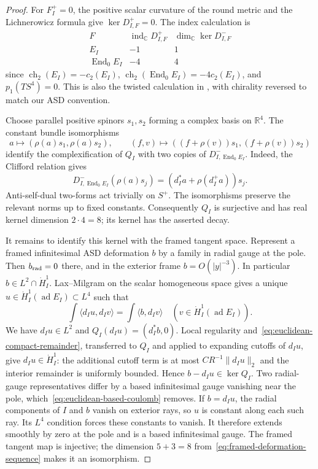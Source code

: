 \documentclass[11pt]{amsart}
\theoremstyle{definition}
\theoremstyle{remark}
\theoremstyle{plain}
\newcommand{\RR}{\mathbb{R}}
\newcommand{\CC}{\mathbb{C}}
\newcommand{\ad}{\operatorname{ad}}
\newcommand{\ind}{\operatorname{ind}}
\begin{document}
\begin{proof}
For $F_I^+=0$, the positive scalar curvature of the round metric
and the Lichnerowicz formula give $\ker D_{I,F}^+=0$.  The index
calculation is
\begin{equation}\label{eq:twisted-index-table}
 \begin{array}{c|cc}
 F&\ind_{\CC}D_{I,F}^+&\dim_{\CC}\ker D_{I,F}^-\\ \hline
 E_I&-1&1\\
 \operatorname{End}_0E_I&-4&4
 \end{array}
\end{equation}
since $\operatorname{ch}_2(E_I)=-c_2(E_I)$,
$\operatorname{ch}_2(\operatorname{End}_0E_I)=-4c_2(E_I)$,
and $p_1(TS^4)=0$.  This is also the twisted calculation in
\cite[Section~10, pp.~459--460]{AHS78}, with chirality reversed to
match our ASD convention.

Choose parallel positive spinors $s_1,s_2$ forming a complex basis
on $\RR^4$.  The constant bundle isomorphisms
\[
 a\longmapsto(\rho(a)s_1,\rho(a)s_2),\qquad
 (f,v)\longmapsto((f+\rho(v))s_1,(f+\rho(v))s_2)
\]
identify the complexification of $Q_I$ with two copies of
$D^-_{I,\operatorname{End}_0E_I}$.  Indeed, the Clifford relation gives
\begin{equation}\label{eq:euclidean-clifford-identification}
 D^-_{I,\operatorname{End}_0E_I}(\rho(a)s_j)
 =(d_I^*a+\rho(d_I^+a))s_j.
\end{equation}
Anti-self-dual two-forms act trivially on $S^+$.  The isomorphisms
preserve the relevant norms up to fixed constants.  Consequently
$Q_I$ is surjective and has real kernel dimension $2\cdot4=8$;
its kernel has the asserted decay.

It remains to identify this kernel with the framed tangent space.
Represent a framed infinitesimal ASD deformation $b$ by a family
in radial gauge at the pole.  Then $b_{\rm rad}=0$ there, and in
the exterior frame $b=O(|y|^{-3})$.  In particular $b\in L^2\cap
\dot H_I^1$.  Lax--Milgram on the scalar homogeneous space gives
a unique $u\in\dot H_I^1(\ad E_I)\subset L^4$ such that
\begin{equation}\label{eq:euclidean-based-coulomb}
 \int\langle d_Iu,d_Iv\rangle
 =\int\langle b,d_Iv\rangle\quad(v\in\dot H_I^1(\ad E_I)).
\end{equation}
We have $d_Iu\in L^2$ and $Q_I(d_Iu)=(d_I^*b,0)$.
Local regularity and~\eqref{eq:euclidean-compact-remainder}, transferred
to $Q_I$ and applied to expanding cutoffs of $d_Iu$, give
$d_Iu\in\dot H_I^1$: the additional cutoff term is at most
$CR^{-1}\|d_Iu\|_2$ and the interior remainder is uniformly bounded.
Hence $b-d_Iu\in\ker Q_I$.
Two radial-gauge representatives differ by a based infinitesimal
gauge vanishing near the pole, which~\eqref{eq:euclidean-based-coulomb}
removes.  If $b=d_Iu$, the radial components of $I$ and $b$ vanish
on exterior rays, so $u$ is constant along each such ray.
Its $L^4$ condition forces these constants to vanish.  It therefore
extends smoothly by zero at the pole and is a based infinitesimal
gauge.  The framed tangent map is injective; the dimension
$5+3=8$ from~\eqref{eq:framed-deformation-sequence} makes it an
isomorphism.


\end{proof}
\end{document}
